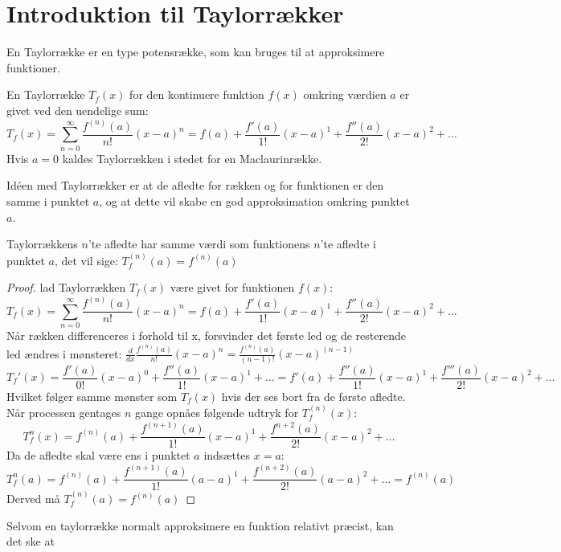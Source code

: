 \chapter{Introduktion til Taylorrækker}
\label{ch:tr}
En Taylorrække er en type potensrække, som kan bruges til at approksimere funktioner.
\begin{defn}
    En Taylorrække $T_f(x)$ for den kontinuere funktion $f(x)$ omkring værdien $a$ er givet ved den uendelige sum:
    \[
        T_f(x) = \sum^{\infty}_{n=0} \frac{f^{(n)}(a)}{n!} (x-a)^{n}
        = f(a) + \frac{f'(a)}{1!}(x-a)^{1} + \frac{f''(a)}{2!}(x-a)^{2} + \ldots
    \]
    Hvis $a = 0$ kaldes Taylorrækken i stedet for en Maclaurinrække.
\end{defn}
\label{def:taylorrække} Idéen med Taylorrækker er at de afledte for rækken og for funktionen er den samme i punktet $a$, 
og at dette vil skabe en god approksimation omkring punktet $a$. 
\begin{thm}
    Taylorrækkens $n$'te afledte har samme værdi som funktionens $n$'te afledte i punktet $a$, 
    det vil sige: $T_f^{(n)}(a) = f^{(n)} (a)$
\end{thm}
\begin{proof}
    lad Taylorrækken $T_f(x)$ være givet for funktionen $f(x)$: 
    \[
        T_f(x) = \sum^{\infty}_{n=0} \frac{f^{(n)}(a)}{n!} (x-a)^{n}
        = f(a) + \frac{f'(a)}{1!}(x-a)^{1} + \frac{f''(a)}{2!}(x-a)^{2} + \ldots
    \]
    Når rækken differenceres i forhold til x, forsvinder det første led og de resterende led ændres i mønsteret: $\frac{d}{dx} \frac{f^{(n)}(a)}{n!} (x-a)^{n} = \frac{f^{(n)}(a)}{(n-1)!} (x-a)^{(n - 1)}$ %
    \[
        T_f'(x) = \frac{f'(a)}{0!}(x-a)^0 + \frac{f''(a)}{1!}(x-a)^{1} + \ldots = f'(a) + \frac{f''(a)}{1!}(x-a)^{1} + \frac{f'''(a)}{2!}(x-a)^{2} + \ldots
    \]
    Hvilket følger samme mønster som $T_f(x)$ hvis der ses bort fra de første afledte. %
    Når processen gentages $n$ gange opnåes følgende udtryk for $T_f^{(n)}(x)$:
    \[
        T_f^{n}(x) = f^{(n)}(a) + \frac{f^{(n + 1)}(a)}{1!}(x-a)^{1} + \frac{f^{n + 2}(a)}{2!}(x-a)^{2} + \ldots
    \]
    Da de afledte skal være ens i punktet $a$ indsættes $x = a$:
    \[
        T_f^{n}(a) = f^{(n)}(a) + \frac{f^{(n + 1)}(a)}{1!}(a-a)^{1} + \frac{f^{(n + 2)}(a)}{2!}(a-a)^{2} + \ldots
        = f^{(n)}(a)
    \]
    Derved må $T_f^{(n)}(a) = f^{(n)}(a)$
\end{proof}
Selvom en taylorrække normalt approksimere en funktion relativt præcist, kan det ske at
